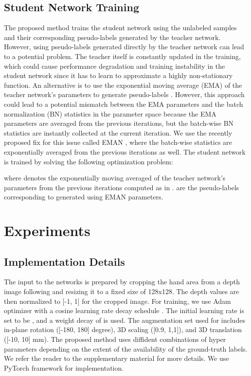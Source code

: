 \documentclass{article}
\begin{document}
\subsection{Student Network Training}
The proposed method trains the student network using the unlabeled samples and their corresponding pseudo-labels generated by the teacher network. However, using pseudo-labels generated directly by the teacher network can lead to a potential problem. The teacher itself is constantly updated in the training, which could cause performance degradation and training instability in the student network since it has to learn to approximate a highly non-stationary function. An alternative is to use the exponential moving average (EMA) of the teacher network's parameters to generate pseudo-labels \cite{tarvainen2017mean}. However, this approach could lead to a potential mismatch between the EMA parameters and the batch normalization (BN) statistics in the parameter space  \cite{cai2021exponential} because the EMA parameters are averaged from the previous iterations, but the batch-wise BN statistics are instantly collected at the current iteration. We use the recently proposed fix for this issue called EMAN \cite{cai2021exponential}, where the batch-wise statistics are exponentially averaged from the previous iterations as well. The student network is trained by solving the following optimization problem:


where  denotes the exponentially moving averaged of the teacher network's parameters from the previous iterations computed as in \cite{cai2021exponential}.  are the pseudo-labels corresponding to  generated using EMAN parameters.



\section{Experiments}
\subsection{Implementation Details}
The input to the networks is prepared by cropping the hand area from a depth image following  \cite{oberweger2017deepprior++} and resizing it to a fixed size of 128x128. The depth values are then normalized to [-1, 1] for the cropped image. For training, we use Adam \cite{kingma2014adam} optimizer with a cosine learning rate decay schedule \cite{loshchilov2016sgdr}. The initial learning rate is set to be , and a weight decay of  is used.  The augmentation set used for  includes in-plane rotation ([-180, 180] degree), 3D scaling ([0.9, 1,1]), and 3D translation ([-10, 10] mm). The proposed method uses diffident combinations of hyper parameters depending on the extent of the availability of the ground-truth labels. We refer the reader to the supplementary material for more details. We use PyTorch framework \cite{paszke2019pytorch} for implementation. 
\end{document}
